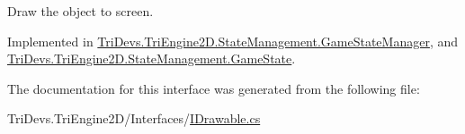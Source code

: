Draw the object to screen. 



Implemented in \hyperlink{class_tri_devs_1_1_tri_engine2_d_1_1_state_management_1_1_game_state_manager_a2d30555c64bf3337e1b6a328abde489e}{Tri\-Devs.\-Tri\-Engine2\-D.\-State\-Management.\-Game\-State\-Manager}, and \hyperlink{class_tri_devs_1_1_tri_engine2_d_1_1_state_management_1_1_game_state_a53a4361f96b0a795f4bb20a5ae5cf954}{Tri\-Devs.\-Tri\-Engine2\-D.\-State\-Management.\-Game\-State}.



The documentation for this interface was generated from the following file\-:\begin{DoxyCompactItemize}
\item 
Tri\-Devs.\-Tri\-Engine2\-D/\-Interfaces/\hyperlink{_i_drawable_8cs}{I\-Drawable.\-cs}\end{DoxyCompactItemize}
